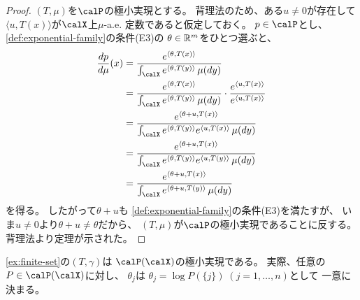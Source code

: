 \documentclass[report]{jlreq}
\begin{document}
\begin{proof}
    $(T, \mu)$を$\calP$の極小実現とする。
    背理法のため、ある$u \neq 0$が存在して
    $\langle u, T(x) \rangle$が$\calX$上$\mu$-a.e. 定数であると仮定しておく。
    $p \in \calP$とし、
    \cref{def:exponential-family}の条件(E3)の
    $\theta \in \mathbb{R}^m$をひとつ選ぶと、
    \begin{alignat}{1}
        \dd[p]{\mu}(x)
            &= \frac{
                e^{\langle \theta, T(x) \rangle}
            }{
                \int_{\calX} e^{\langle \theta, T(y) \rangle} \, \mu(dy)
            } \\
            &= \frac{
                e^{\langle \theta, T(x) \rangle}
            }{
                \int_{\calX} e^{\langle \theta, T(y) \rangle} \, \mu(dy)
            }
            \cdot \frac{
                e^{\langle u, T(x) \rangle}
            }{
                e^{\langle u, T(x) \rangle}
            } \\
            &= \frac{
                e^{\langle \theta + u, T(x) \rangle}
            }{
                \int_{\calX}
                e^{\langle \theta, T(y) \rangle}
                e^{\langle u, T(x) \rangle}
                \, \mu(dy)
            } \\
            &= \frac{
                e^{\langle \theta + u, T(x) \rangle}
            }{
                \int_{\calX}
                e^{\langle \theta, T(y) \rangle}
                e^{\langle u, T(y) \rangle}
                \, \mu(dy)
            } \\
            &= \frac{
                e^{\langle \theta + u, T(x) \rangle}
            }{
                \int_{\calX}
                e^{\langle \theta + u, T(y) \rangle}
                \, \mu(dy)
            }
    \end{alignat}
    を得る。
    したがって$\theta + u$も
    \cref{def:exponential-family}の条件(E3)を満たすが、
    いま$u \neq 0$より$\theta + u \neq \theta$だから、
    $(T, \mu)$が$\calP$の極小実現であることに反する。
    背理法より定理が示された。
\end{proof}

\begin{example}[有限集合上の確率分布族]
    \cref{ex:finite-set}の$(T, \gamma)$は
    $\calP(\calX)$の極小実現である。
    実際、任意の$P \in \calP(\calX)$に対し、
    $\theta_j$は
    $\theta_j = \log P(\{ j \}) \; (j = 1, \dots, n)$として
    一意に決まる。
\end{example}

%
\end{document}
